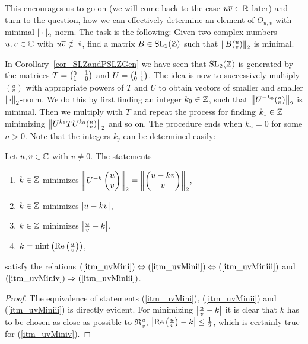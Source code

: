 This encourages us to go on (we will come back to the case $u \conj{v} \in \R$ later) and turn to the question, how we can effectively determine an element of $O_{u,v}$ with minimal $\eucnorm{\cdot}$-norm. The task is the following: Given two complex numbers $u,v \in \C$ with $u \conj{v} \notin \R$, find a matrix $B \in \SL{\Z}$ such that $\eucnorm{B ({}^u_v)}$ is minimal. 

In Corollary~\ref{cor_SLZandPSLZGen} we have seen that $\SL{\Z}$ is generated by the matrices $T = \smallmat{0}{-1}{1}{\phantom{-}0}$ and $U = \smallmat{1}{1}{0}{1}$. The idea is now to successively multiply $({}^u_v)$ with appropriate powers of $T$ and $U$ to obtain vectors of smaller and smaller $\eucnorm{\cdot}$-norm. We do this by first finding an integer $k_0 \in \Z$, such that $\eucnorm{U^{-k_0} ({}^u_v)}$ is minimal. Then we multiply with $T$ and repeat the process for finding $k_1 \in \Z$ minimizing $\eucnorm{U^{k_1} T U^{k_0} ({}^u_v)}$ and so on. The procedure ends when $k_n = 0$ for some $n>0$. Note that the integers $k_j$ can be determined easily:
\begin{lemma}
\label{lem_FunDomUVMin}
Let $u,v \in \C$ with $v \ne 0$. The statements
\begin{enumerate}[\qquad(i)]
\item \label{itm_uvMini}
$k \in \Z$ minimizes $\eucnorm{U^{-k}\cvec{u}{v}} = \eucnorm{\cvec{u - k v}{v}}$,
\item \label{itm_uvMinii} $k \in \Z$ minimizes $\abs{u - k v}$,
\item \label{itm_uvMiniii} $k \in \Z$ minimizes $\abs{\frac{u}{v} - k}$,
\item \label{itm_uvMiniv} $k = \nint{\Re{\frac{u}{v}}}$,
\end{enumerate}
satisfy the relations $(\ref{itm_uvMini}) \Leftrightarrow (\ref{itm_uvMinii}) \Leftrightarrow (\ref{itm_uvMiniii})$ and $(\ref{itm_uvMiniv}) \Rightarrow (\ref{itm_uvMiniii})$.
\end{lemma}
\begin{proof}
The equivalence of statements (\ref{itm_uvMini}), (\ref{itm_uvMinii}) and (\ref{itm_uvMiniii}) is directly evident. For minimizing $\abs{\frac{u}{v} - k}$ it is clear that $k$ has to be chosen as close as possible to $\Re{\frac{u}{v}}$, \ie $\abs{\Re{\frac{u}{v}} - k} \le \reci{2}$, which is certainly true for (\ref{itm_uvMiniv}).
\end{proof}

